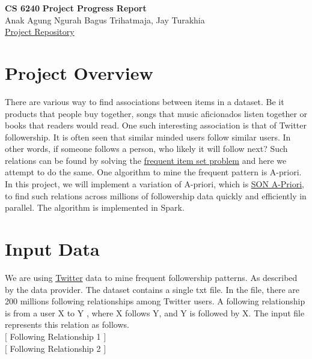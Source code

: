 \documentclass[11pt]{article}
\begin{document}
\thispagestyle{empty}
\setlength{\parindent}{0pt}
\setlength{\parskip}{1.8ex}
\lstset{language=Scala}
\newcommand{\hs}{\hspace{.1in}}

\begin{center}
    \Large{\bf CS 6240}
    \Large{\bf Project Progress Report\\}
    \Large{Anak Agung Ngurah Bagus Trihatmaja, Jay Turakhia\\}
    \href{https://github.ccs.neu.edu/prdx/CS6240-Project}{Project Repository}  \\
\end{center}
\medskip

\section{Project Overview}
There are various way to find associations between items in a dataset.
Be it products that people buy together, songs that music aficionados listen together or books that readers would read.
One such interesting association is that of Twitter followership.
It is often seen that similar minded users follow similar users.
In other words, if someone follows a person, who likely it will follow next?
Such relations can be found by solving the \href{https://en.wikipedia.org/wiki/Association_rule_learning}{frequent item set problem} and here we attempt to do the same.
One algorithm to mine the frequent pattern is A-priori.
In this project, we will implement a variation of A-priori, which is \href{http://www.vldb.org/conf/1995/P432.PDF}{SON A-Priori}, to find such relations across millions of followership data quickly and efficiently in parallel.
The algorithm is implemented in Spark.

\section{Input Data}
We are using \href{https://wiki.illinois.edu//wiki/display/forward/Dataset-UDI-TwitterCrawl-Aug2012}{Twitter} data to mine frequent followership patterns.
As described by the data provider.
The dataset contains a single txt file.
In the file, there are 200 millions following relationships among Twitter users.
A following relationship is from a user X to Y , where X follows Y, and Y is followed by X.
The input file represents this relation as follows.\\
$\big[$ Following Relationship 1 $\big]$\\
$\big[$ Following Relationship 2 $\big]$
\end{document}
